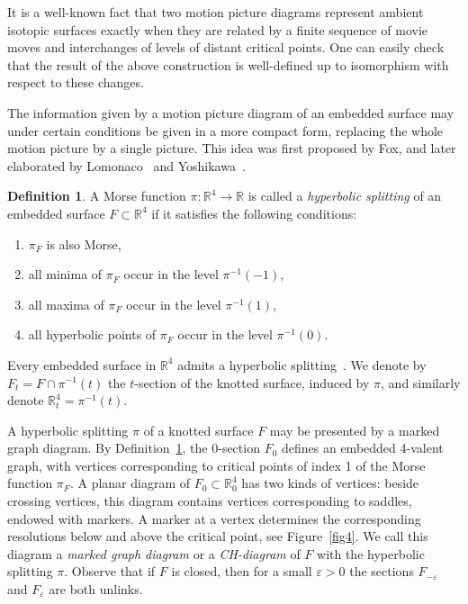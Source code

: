 \documentclass[a4paper,12pt]{amsart}
\numberwithin{equation}{section}
\theoremstyle{plain}
\theoremstyle{definition}
\newtheorem{definition}[theorem]{Definition}
\newcommand{\RR}{\mathbb{R}}
\renewcommand{\epsilon}{\varepsilon}
\begin{document}
It is a well-known fact that two motion picture diagrams represent ambient isotopic surfaces exactly when they are related by a finite sequence of
movie moves and interchanges of levels of distant critical points. One can easily check that the result of the above construction is
well-defined up to isomorphism with respect to these changes.


The information given by a motion picture diagram of an embedded surface may under certain conditions be given in a more compact form, 
replacing the whole motion picture by a single picture. This idea was first proposed by Fox, and later elaborated by Lomonaco~\cite{L} and Yoshikawa~\cite{Y}. 




\begin{definition} 
	\label{def1} 
	A Morse function $\pi \colon \RR ^{4}\to \RR $ is called a \textit{hyperbolic splitting} of an embedded surface $F\subset \RR ^{4}$ if it satisfies the following conditions:
	\begin{enumerate}
		\item $\pi _{F}$ is also Morse,
		\item all minima of $\pi _{F}$ occur in the level $\pi ^{-1}(-1)$,
		\item all maxima of $\pi _{F}$ occur in the level $\pi ^{-1}(1)$,
		\item all hyperbolic points of $\pi _{F}$ occur in the level $\pi ^{-1}(0)$.
	\end{enumerate}
\end{definition}
Every embedded surface in $\RR ^4$ admits a hyperbolic splitting~\cite{L}. 
We denote by $F_{t}=F\cap \pi ^{-1}(t)$ the $t$-section of the knotted surface, induced by $\pi $, and similarly denote $\RR ^{4}_{t}=\pi ^{-1}(t)$.


A hyperbolic splitting $\pi $ of a knotted surface $F$ may be presented by a marked graph diagram. 
By Definition~\ref{def1}, the 0-section $F_{0}$ defines an embedded 4-valent graph, with vertices corresponding to critical points of index 1 of the Morse function $\pi _{F}$. 
A planar diagram of $F_{0}\subset \RR ^{4}_{0}$ has two kinds of vertices: beside crossing vertices, this diagram contains vertices corresponding to saddles, endowed with markers. 
A marker at a vertex determines the corresponding resolutions below and above the critical point, see Figure~\ref{fig4}. 
We call this diagram a \textit{marked graph diagram} or a \textit{CH-diagram} of $F$ with the hyperbolic splitting $\pi $.
Observe that if $F$ is closed, then for a small $\epsilon >0$ the sections $F_{-\epsilon }$ and $F_{\epsilon }$ are both unlinks. 
\end{document}
